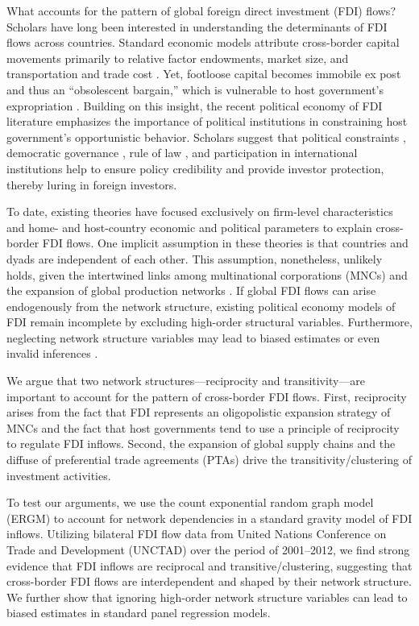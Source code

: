 \documentclass{article}
\begin{document}
What accounts for the pattern of global foreign direct investment (FDI) flows? Scholars have long been interested in understanding the determinants of FDI flows across countries. Standard economic models attribute cross-border capital movements primarily to relative factor endowments, market size, and transportation and trade cost \citep[see,~e.g.,][]{Helpman:1984,Carr_et_al:2001}. Yet, footloose capital becomes immobile ex post and thus an ``obsolescent bargain,'' which is vulnerable to host government's expropriation \citep{Vernon:1971,Vernon:1980}. Building on this insight, the recent political economy of FDI literature emphasizes the importance of political institutions in constraining host government's opportunistic behavior. Scholars suggest that political constraints \citep{Henisz:2000}, democratic governance \citep{Jensen:2003,Jensen:2006}, rule of law \citep{Li_Resnick:2003,Staats_Biglaiser:2012}, and participation in international institutions \citep{Buthe_Milner:2008,Allee_Peinhardt:2011} help to ensure policy credibility and provide investor protection, thereby luring in foreign investors.

To date, existing theories have focused exclusively on firm-level characteristics and home- and host-country economic and political parameters to explain cross-border FDI flows. One implicit assumption in these theories is that countries and dyads are independent of each other. This assumption, nonetheless, unlikely holds, given the intertwined links among multinational corporations (MNCs) and the expansion of global production networks \citep{UNCTAD:2013}. If global FDI flows can arise endogenously from the network structure, existing political economy models of FDI remain incomplete by excluding high-order structural variables. Furthermore, neglecting network structure variables may lead to biased estimates or even invalid inferences \citep{cranmer2011inferential}.

We argue that two network structures---reciprocity and transitivity---are important to account for the pattern of cross-border FDI flows. First, reciprocity arises from the fact that FDI represents an oligopolistic expansion strategy of MNCs and the fact that host governments tend to use a principle of reciprocity to regulate FDI inflows. Second, the expansion of global supply chains and the diffuse of preferential trade agreements (PTAs) drive the transitivity/clustering of investment activities.

To test our arguments, we use the count exponential random graph model (ERGM) to account for network dependencies in a standard gravity model of FDI inflows. Utilizing bilateral FDI flow data from United Nations Conference on Trade and Development (UNCTAD) over the period of 2001--2012, we find strong evidence that FDI inflows are reciprocal and transitive/clustering, suggesting that cross-border FDI flows are interdependent and shaped by their network structure. We further show that ignoring high-order network structure variables can lead to biased estimates in standard panel regression models.
\end{document}
